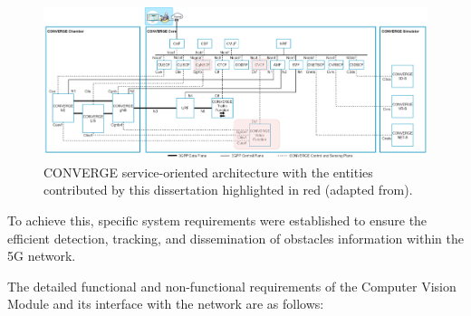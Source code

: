 \begin{figure}[H]
    \centering
    \includegraphics[width=0.9\linewidth]{figures/converge_my_work.drawio}
    \caption[CONVERGE service-oriented architecture with the entities contributed by this dissertation highlighted in red]{CONVERGE service-oriented architecture with the entities contributed by this dissertation highlighted in red (adapted from\cite{converge2023_specs}).}
    \label{fig:my_chamber}
\end{figure}

To achieve this, specific system requirements were established to ensure the efficient detection, tracking, and dissemination of obstacles information within the 5G network.

The detailed functional and non-functional requirements of the Computer Vision Module and its interface with the network are as follows:

